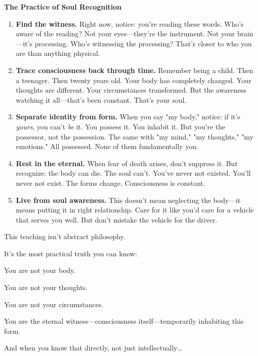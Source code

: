 \documentclass[11pt,twoside]{book}
\begin{document}
\begin{practicebox}
\textbf{The Practice of Soul Recognition}

\begin{enumerate}
\item \textbf{Find the witness.} Right now, notice: you're reading these words. Who's aware of the reading? Not your eyes—they're the instrument. Not your brain—it's processing. Who's witnessing the processing? That's closer to who you are than anything physical.

\item \textbf{Trace consciousness back through time.} Remember being a child. Then a teenager. Then twenty years old. Your body has completely changed. Your thoughts are different. Your circumstances transformed. But the awareness watching it all—that's been constant. That's your soul.

\item \textbf{Separate identity from form.} When you say "my body," notice: if it's \textit{yours}, you can't \textit{be} it. You possess it. You inhabit it. But you're the possessor, not the possession. The same with "my mind," "my thoughts," "my emotions." All possessed. None of them fundamentally you.

\item \textbf{Rest in the eternal.} When fear of death arises, don't suppress it. But recognize: the body can die. The soul can't. You've never not existed. You'll never not exist. The forms change. Consciousness is constant.

\item \textbf{Live from soul awareness.} This doesn't mean neglecting the body—it means putting it in right relationship. Care for it like you'd care for a vehicle that serves you well. But don't mistake the vehicle for the driver.
\end{enumerate}
\end{practicebox}

This teaching isn't abstract philosophy.

It's the most practical truth you can know:

You are not your body.

You are not your thoughts.

You are not your circumstances.

You are the eternal witness—consciousness itself—temporarily inhabiting this form.

And when you know that directly, not just intellectually\ldots{}
\end{document}
